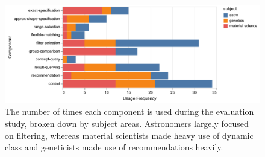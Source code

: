 \begin{figure}[h!]
  \includegraphics[width=\linewidth]{figures/usagefreqbysubject.pdf}
  \caption{The number of times each component is used during the evaluation study, broken down by subject areas. Astronomers largely focused on filtering, whereas material scientists made heavy use of dynamic class and geneticists made use of recommendations heavily.}\label{fig:usagefreqbysubject}
\end{figure}
